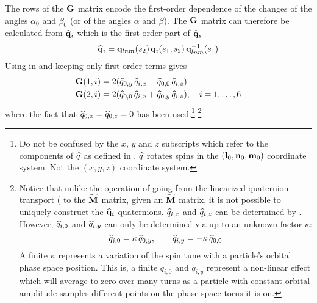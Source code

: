 The rows of the ${\bf G}$ matrix encode the first-order dependence of the changes of the angles
$\alpha_0$ and $\beta_0$ (or of the angles $\alpha$ and $\beta$).  The ${\bf G}$ matrix can therefore
be calculated from $\widehat{{\bf q}}_i$ which is the first order part of $\widehat{{\bf q}}_s$
\begin{equation}
  \widehat{{\bf q}}_i = {\bf q}_{lnm}(s_2) \, {\bf q}_i(s_1, s_2) \, {\bf q}_{lnm}^{-1}(s_1)
\end{equation}
Using  in  and keeping only first order terms gives
\begin{align}
  {\bf G}(1,i) &= 2 (\widehat q_{0,y} \, \widehat q_{i,x} - \widehat q_{0,0} \, \widehat q_{i,z}) 
  \label{g2qqqq} \\
  {\bf G}(2,i) &= 2 (\widehat q_{0,0} \, \widehat q_{i,x} + \widehat q_{0,y} \, \widehat q_{i,z}),
  \quad i = 1, \ldots, 6
  \nonumber
\end{align}
where the fact that $\widehat q_{0,x} = \widehat q_{0,z} = 0$ has been used.\footnote
  {
Do not be confused by the $x$, $y$ and $z$ subscripts which refer to the components of $\widehat q$
as defined in . $\widehat q$ rotates spins in the $({\bf l}_0, {\bf n}_0, {\bf m}_0)$ coordinate system.
Not the $(x, y, z)$ coordinate system.
  }
\footnote
  {
Notice that unlike the operation of going from the linearized quaternion transport ( to the
$\widetilde{{\bf M}}$ matrix, given an $\widetilde{{\bf M}}$ matrix, it is not possible to uniquely construct
the $\widehat{{\bf q}}_i$ quaternions. $\widehat q_{i,x}$ and $\widehat q_{i,z}$ can be determined by
. However, $\widehat q_{i,0}$ and $\widehat q_{i,y}$ can only be determined via  up
to an unknown factor $\kappa$:
\begin{equation}
  \widehat q_{i,0} = \kappa \, \widehat q_{0,y}, \qquad \widehat q_{i,y} = -\kappa \, \widehat q_{0,0}
\end{equation}
A finite $\kappa$ represents a variation of the spin tune with a particle's orbital phase space
position. This is, a finite $q_{i,0}$ and $q_{i,y}$ represent a non-linear effect which will average
to zero over many turns as a particle with constant orbital amplitude samples different points on
the phase space torus it is on.
  }

